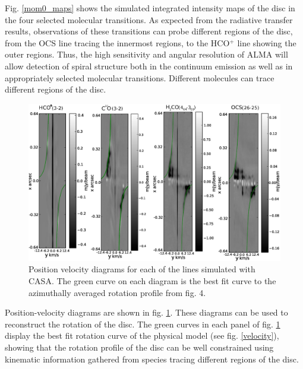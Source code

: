 \documentclass[useAMS,usenatbib]{mn2e}
\begin{document}
Fig. \ref{mom0_maps} shows the simulated integrated intensity maps of the disc in the four selected molecular transitions. As expected from the radiative transfer results, observations of these transitions can probe different regions of the disc, from the OCS line tracing the innermost regions, to the HCO$^+$ line showing the outer regions. Thus, the high sensitivity and angular resolution of ALMA will allow detection of spiral structure both in the continuum emission as well as  in appropriately selected molecular transitions. Different molecules can trace different regions of the disc.\smallskip

\begin{figure}
 \includegraphics[width=180mm]{Figures/sim/casa_all_30deg_PV_rotCurve_small2.eps}
 \caption{Position velocity diagrams for each of the lines simulated with CASA. The green curve on each diagram is the best fit curve to the azimuthally averaged rotation profile from fig. 4.}
 \label{pvs}
\end{figure}

Position-velocity diagrams are shown in fig. \ref{pvs}. These diagrams can be used to reconstruct the rotation of the disc. The green curves in each panel of fig. \ref{pvs} display the best fit rotation curve of the physical model (see fig. \ref{velocity}), showing that the rotation profile of the disc can be well constrained using kinematic information gathered from species tracing different regions of the disc.\smallskip
\end{document}
